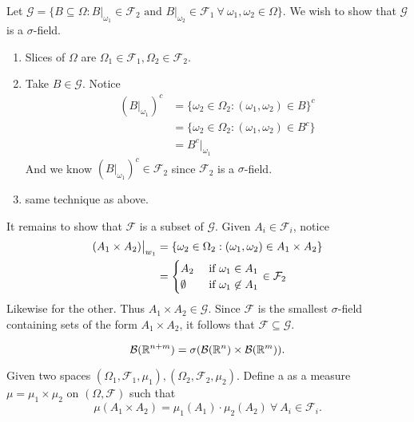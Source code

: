 \documentclass[class=article,crop=false]{standalone}
\begin{document}
\begin{prf}
	Let $ \mathcal{G} = \{ B \subseteq \Omega: B\big|_{\omega_1} \in \mathcal{F}_2 \text{ and } B\big|_{\omega_2} \in \mathcal{F}_1 \ \forall \ \omega_1,\omega_2 \in \Omega\} $. We wish to show that $ \mathcal{G}$ is a $\sigma$-field.
	\begin{enumerate}[label=(\roman*)]
		\item Slices of $ \Omega$ are $ \Omega_1 \in \mathcal{F}_1, \Omega_2 \in \mathcal{F}_2 $. 
		\item Take $ B \in \mathcal{G}$. Notice
			\begin{align*}
				(B \big|_{\omega_1})^{c} &= \{\omega_2 \in \Omega_2: (\omega_1, \omega_2) \in B\}^{c}  \\
							 &= \{\omega_2 \in \Omega_2: (\omega_1,\omega_2) \in B^{c}\} \\
							 &= B^{c}\big|_{\omega_1}
			\end{align*}
			And we know $ (B\big|_{\omega_1})^{c} \in \mathcal{F}_2$ since $ \mathcal{F}_2$ is a $\sigma$-field.
		\item same technique as above.
	\end{enumerate}

	It remains to show that $ \mathcal{F}$ is a subset of $ \mathcal{G}$. Given $ A_i \in \mathcal{F}_i$, notice
	\begin{align*}
		(A_1 \times A_2 )\big|_{w_1} &= \{\omega_2 \in \Omega_2: (\omega_1,\omega_2) \in A_1 \times A_2\}  \\
					     &= \begin{cases}
						     A_2 &\text{ if } \omega_1 \in A_1\\
						     \emptyset & \text{ if } \omega_1  \not\in A_1\\
					     \end{cases} \in \mathcal{F}_2 
	\end{align*}
	Likewise for the other. Thus $ A_1 \times A_2 \in \mathcal{G}$. Since $ \mathcal{F}$ is the smallest $\sigma$-field containing sets of the form $ A_1 \times A_2$, it follows that $ \mathcal{F} \subseteq \mathcal{G}$.
\end{prf}


\begin{thm}[]
\[
	\mathcal{B}(\mathbb{R}^{n+m}) = \sigma(\mathcal{B}(\mathbb{R}^{n})\times \mathcal{B}(\mathbb{R}^{m}))
.\]
\end{thm}

\begin{defn}
	Given two spaces $ (\Omega_1, \mathcal{F}_1,\mu_1), (\Omega_2, \mathcal{F}_2, \mu_2)$. Define a  as a measure $ \mu= \mu_1 \times \mu_2$ on $ (\Omega,\mathcal{F})$ such that 
	\[
		\mu(A_1 \times A_2) = \mu_1(A_1) \cdot \mu_2(A_2) \ \forall \ A_i \in \mathcal{F}_i
	.\] 
\end{defn}
\end{document}
